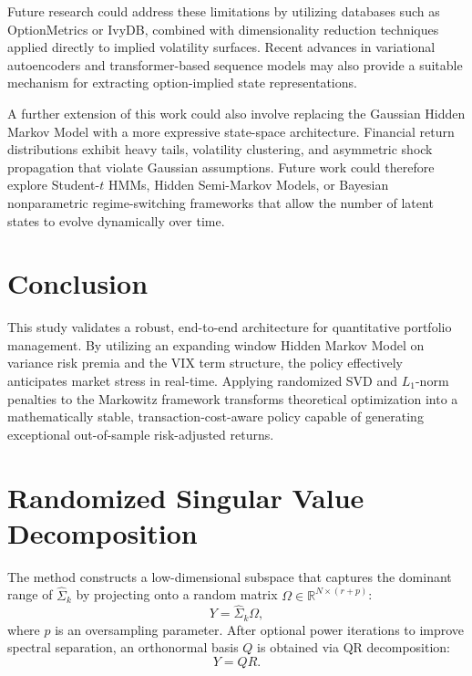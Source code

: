 \documentclass[12pt]{article}
\begin{document}
Future research could address these limitations by utilizing databases such as OptionMetrics or IvyDB, combined with dimensionality reduction techniques applied directly to implied volatility surfaces. Recent advances in variational autoencoders and transformer-based sequence models may also provide a suitable mechanism for extracting option-implied state representations.

A further extension of this work could also involve replacing the Gaussian Hidden Markov Model with a more expressive state-space architecture. Financial return distributions exhibit heavy tails, volatility clustering, and asymmetric shock propagation that violate Gaussian assumptions. Future work could therefore explore Student-$t$ HMMs, Hidden Semi-Markov Models, or Bayesian nonparametric regime-switching frameworks that allow the number of latent states to evolve dynamically over time.

\section{Conclusion}
This study validates a robust, end-to-end architecture for quantitative portfolio management. By utilizing an expanding window Hidden Markov Model on variance risk premia and the VIX term structure, the policy effectively anticipates market stress in real-time. Applying randomized SVD and $L_1$-norm penalties to the Markowitz framework transforms theoretical optimization into a mathematically stable, transaction-cost-aware policy capable of generating exceptional out-of-sample risk-adjusted returns.

\newpage

\nocite{*}

\newpage
\appendix

\section{Randomized Singular Value Decomposition}
\label{appendix:RSVD}

The method constructs a low-dimensional subspace that captures the dominant range of $\hat{\Sigma}_k$ by projecting onto a random matrix $\Omega \in \mathbb{R}^{N \times (r + p)}$:
\begin{equation}
Y = \hat{\Sigma}_k \Omega,
\end{equation}
where $p$ is an oversampling parameter. After optional power iterations to improve spectral separation, an orthonormal basis $Q$ is obtained via QR decomposition:
\begin{equation}
Y = QR.
\end{equation}
\end{document}
